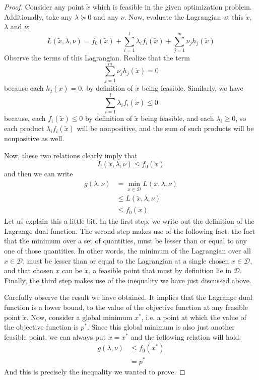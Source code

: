 \documentclass[a4paper]{article}
\theoremstyle{definition}
\begin{document}
\begin{proof}
	Consider any point $\tilde{x}$ which is feasible in the given optimization problem.
	Additionally, take any $\lambda \succeq 0$ and any $\nu$.
	Now, evaluate the Lagrangian at this $\tilde{x}$, $\lambda$ and $\nu$:
	\begin{equation*}
		L(\tilde{x}, \lambda, \nu) = f_0(\tilde{x}) + \sum_{i=1}^l \lambda_i f_i(\tilde{x}) + \sum_{j=1}^m \nu_j h_j(\tilde{x})
	\end{equation*}
	Observe the terms of this Lagrangian.
	Realize that the term
	\begin{equation*}
		\sum_{j=1}^m \nu_j h_j(\tilde{x}) = 0
	\end{equation*}
	because each $h_j(\tilde{x}) = 0$, by definition of $\tilde{x}$ being feasible.
	Similarly, we have
	\begin{equation*}
		\sum_{i=1}^l \lambda_i f_i(\tilde{x}) \leq 0
	\end{equation*}
	because, each $f_i(\tilde{x}) \leq 0$ by definition of $\tilde{x}$ being feasible, and each $\lambda_i \geq 0$, so each product $\lambda_i f_i(\tilde{x})$ will be nonpositive, and the sum of such products will be nonpositive as well.

	Now, these two relations clearly imply that
	\begin{equation*}
		L(\tilde{x}, \lambda, \nu) \leq f_0(\tilde{x})
	\end{equation*}
	and then we can write
	\begin{align*}
		g(\lambda, \nu) & = \min_{x \in \mathcal{D}} L(x, \lambda, \nu) \\
		& \leq L(\tilde{x}, \lambda, \nu) \\
		& \leq f_0(\tilde{x})
	\end{align*}
	Let us explain this a little bit.
	In the first step, we write out the definition of the Lagrange dual function.
	The second step makes use of the following fact: the fact that the minimum over a set of quantities, must be lesser than or equal to any one of those quantities.
	In other words, the minimum of the Lagrangian over all $x \in \mathcal{D}$, must be lesser than or equal to the Lagrangian at a single chosen $x \in \mathcal{D}$, and that chosen $x$ can be $\tilde{x}$, a feasible point that must by definition lie in $\mathcal{D}$.
	Finally, the third step makes use of the inequality we have just discussed above.

	Carefully observe the result we have obtained.
	It implies that the Lagrange dual function is a lower bound, to the value of the objective function at any feasible point $\tilde{x}$.
	Now, consider a global minimum $x^*$, i.e. a point at which the value of the objective function is $p^*$.
	Since this global minimum is also just another feasible point, we can always put $\tilde{x} = x^*$ and the following relation will hold:
	\begin{align*}
		g(\lambda, \nu) & \leq f_0(x^*) \\
		& = p^*
	\end{align*}
	And this is precisely the inequality we wanted to prove.
\end{proof}
\end{document}
